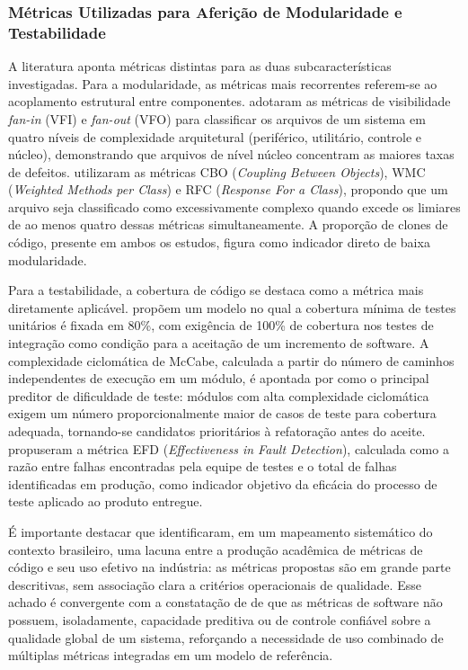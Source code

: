 \subsubsection{Métricas Utilizadas para Aferição de Modularidade e Testabilidade}

A literatura aponta métricas distintas para as duas subcaracterísticas investigadas. Para a modularidade, as métricas mais recorrentes referem-se ao acoplamento estrutural entre componentes.  adotaram as métricas de visibilidade \textit{fan-in} (VFI) e \textit{fan-out} (VFO) para classificar os arquivos de um sistema em quatro níveis de complexidade arquitetural (periférico, utilitário, controle e núcleo), demonstrando que arquivos de nível núcleo concentram as maiores taxas de defeitos.  utilizaram as métricas CBO (\textit{Coupling Between Objects}), WMC (\textit{Weighted Methods per Class}) e RFC (\textit{Response For a Class}), propondo que um arquivo seja classificado como excessivamente complexo quando excede os limiares de ao menos quatro dessas métricas simultaneamente. A proporção de clones de código, presente em ambos os estudos, figura como indicador direto de baixa modularidade.

Para a testabilidade, a cobertura de código se destaca como a métrica mais diretamente aplicável.  propõem um modelo no qual a cobertura mínima de testes unitários é fixada em 80\%, com exigência de 100\% de cobertura nos testes de integração como condição para a aceitação de um incremento de software. A complexidade ciclomática de McCabe, calculada a partir do número de caminhos independentes de execução em um módulo, é apontada por  como o principal preditor de dificuldade de teste: módulos com alta complexidade ciclomática exigem um número proporcionalmente maior de casos de teste para cobertura adequada, tornando-se candidatos prioritários à refatoração antes do aceite.  propuseram a métrica EFD (\textit{Effectiveness in Fault Detection}), calculada como a razão entre falhas encontradas pela equipe de testes e o total de falhas identificadas em produção, como indicador objetivo da eficácia do processo de teste aplicado ao produto entregue.

É importante destacar que  identificaram, em um mapeamento sistemático do contexto brasileiro, uma lacuna entre a produção acadêmica de métricas de código e seu uso efetivo na indústria: as métricas propostas são em grande parte descritivas, sem associação clara a critérios operacionais de qualidade. Esse achado é convergente com a constatação de  de que as métricas de software não possuem, isoladamente, capacidade preditiva ou de controle confiável sobre a qualidade global de um sistema, reforçando a necessidade de uso combinado de múltiplas métricas integradas em um modelo de referência.


